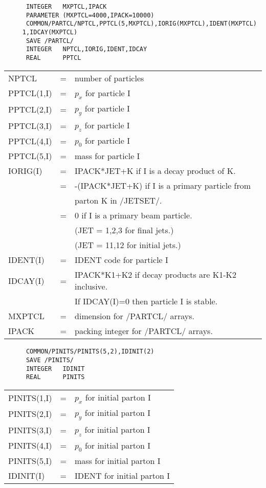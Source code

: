 \begin{verbatim}
      INTEGER   MXPTCL,IPACK
      PARAMETER (MXPTCL=4000,IPACK=10000)
      COMMON/PARTCL/NPTCL,PPTCL(5,MXPTCL),IORIG(MXPTCL),IDENT(MXPTCL)
     1,IDCAY(MXPTCL)
      SAVE /PARTCL/
      INTEGER   NPTCL,IORIG,IDENT,IDCAY
      REAL      PPTCL
\end{verbatim}
\begin{tabular}{lcl}
NPTCL              &=& number of particles\\
PPTCL(1,I)         &=& $p_x$ for particle I\\
PPTCL(2,I)         &=& $p_y$ for particle I\\
PPTCL(3,I)         &=& $p_z$ for particle I\\
PPTCL(4,I)         &=& $p_0$ for particle I\\
PPTCL(5,I)         &=& mass for particle I\\
IORIG(I)           &=& IPACK*JET+K if I is a decay product of K.\\
                   &=& -(IPACK*JET+K) if I is a primary particle from\\
                   &&  parton K in /JETSET/.\\
                   &=& 0 if I is a primary beam particle.\\
                   && (JET = 1,2,3 for final jets.)\\
                   && (JET = 11,12 for initial jets.)\\
IDENT(I)           &=& IDENT code for particle I\\
IDCAY(I)           &=& IPACK*K1+K2 if decay products are K1-K2 inclusive.\\
                   && If IDCAY(I)=0 then particle I is stable.\\
MXPTCL             &=& dimension for /PARTCL/ arrays.\\
IPACK              &=& packing integer for /PARTCL/ arrays.\\
\end{tabular}

\begin{verbatim}
      COMMON/PINITS/PINITS(5,2),IDINIT(2)
      SAVE /PINITS/
      INTEGER   IDINIT
      REAL      PINITS
\end{verbatim}
\begin{tabular}{lcl}
PINITS(1,I)        &=& $p_x$ for initial parton I\\
PINITS(2,I)        &=& $p_y$ for initial parton I\\
PINITS(3,I)        &=& $p_z$ for initial parton I\\
PINITS(4,I)        &=& $p_0$ for initial parton I\\
PINITS(5,I)        &=& mass for initial parton I\\
IDINIT(I)          &=& IDENT for initial parton I\\
\end{tabular}

